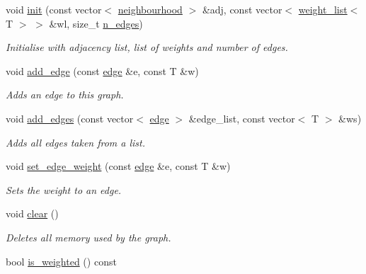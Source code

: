 \begin{DoxyCompactItemize}
void \hyperlink{classlgraph_1_1utils_1_1wxgraph_a061c179dd8091ba050fa445cbc94218c}{init} (const vector$<$ \hyperlink{namespacelgraph_1_1utils_a0f2ef47028a466d26841709e705390ac}{neighbourhood} $>$ \&adj, const vector$<$ \hyperlink{namespacelgraph_1_1utils_a11e7963f3637ea13778b8d3e69d2c17f}{weight\-\_\-list}$<$ T $>$ $>$ \&wl, size\-\_\-t \hyperlink{classlgraph_1_1utils_1_1xxgraph_af3f7c3835406c2cbf70479ae1c0253c9}{n\-\_\-edges})
\begin{DoxyCompactList}\small\item\em Initialise with adjacency list, list of weights and number of edges. \end{DoxyCompactList}\item 
void \hyperlink{classlgraph_1_1utils_1_1wxgraph_adc945f23e3008ee9ef3f65dc5656e953}{add\-\_\-edge} (const \hyperlink{namespacelgraph_1_1utils_a6510284ce1b1ae5dc97ce5d2de426e10}{edge} \&e, const T \&w)
\begin{DoxyCompactList}\small\item\em Adds an edge to this graph. \end{DoxyCompactList}\item 
void \hyperlink{classlgraph_1_1utils_1_1wxgraph_a972a2483966f4b1d485c5d14157ee9be}{add\-\_\-edges} (const vector$<$ \hyperlink{namespacelgraph_1_1utils_a6510284ce1b1ae5dc97ce5d2de426e10}{edge} $>$ \&edge\-\_\-list, const vector$<$ T $>$ \&ws)
\begin{DoxyCompactList}\small\item\em Adds all edges taken from a list. \end{DoxyCompactList}\item 
void \hyperlink{classlgraph_1_1utils_1_1wxgraph_a7db98bd89ecabcf4b700780568a9a719}{set\-\_\-edge\-\_\-weight} (const \hyperlink{namespacelgraph_1_1utils_a6510284ce1b1ae5dc97ce5d2de426e10}{edge} \&e, const T \&w)
\begin{DoxyCompactList}\small\item\em Sets the weight to an edge. \end{DoxyCompactList}\item 
void \hyperlink{classlgraph_1_1utils_1_1wxgraph_a421bc8166e35335445e45efc680ebe3f}{clear} ()
\begin{DoxyCompactList}\small\item\em Deletes all memory used by the graph. \end{DoxyCompactList}\item 
\hypertarget{classlgraph_1_1utils_1_1wxgraph_adda596cfbf72080d46ab445679fe092f}{bool \hyperlink{classlgraph_1_1utils_1_1wxgraph_adda596cfbf72080d46ab445679fe092f}{is\-\_\-weighted} () const }\label{classlgraph_1_1utils_1_1wxgraph_adda596cfbf72080d46ab445679fe092f}


\end{DoxyCompactItemize}
